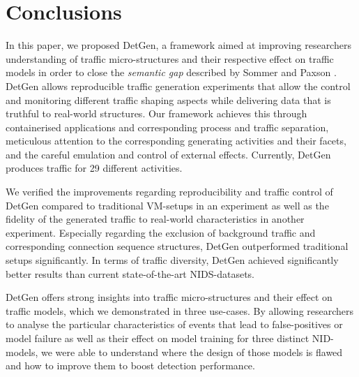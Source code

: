 \documentclass[sigconf]{acmart}
\begin{document}
\section{Conclusions}\label{Sec:Conclusion}

In this paper, we proposed DetGen, a framework aimed at improving researchers understanding of traffic micro-structures and their respective effect on traffic models in order to close the \emph{semantic gap} described by Sommer and Paxson \cite{sommer2010outside}. DetGen allows reproducible traffic generation experiments that allow the control and monitoring different traffic shaping aspects while delivering data that is truthful to real-world structures. Our framework achieves this through containerised applications and corresponding process and traffic separation, meticulous attention to the corresponding generating activities and their facets, and the careful emulation and control of external effects. Currently, DetGen produces traffic for 29 different activities.

We verified the improvements regarding reproducibility and traffic control of DetGen compared to traditional VM-setups in an experiment as well as the fidelity of the generated traffic to real-world characteristics in another experiment. Especially regarding the exclusion of background traffic and corresponding connection sequence structures, DetGen outperformed traditional setups significantly. In terms of traffic diversity, DetGen achieved significantly better results than current state-of-the-art NIDS-datasets.

DetGen offers strong insights into traffic micro-structures and their effect on traffic models, which we demonstrated in three use-cases. By allowing researchers to analyse the particular characteristics of events that lead to false-positives or model failure as well as their effect on model training for three distinct NID-models, we were able to understand where the design of those models is flawed and how to improve them to boost detection performance. 

\end{document}
